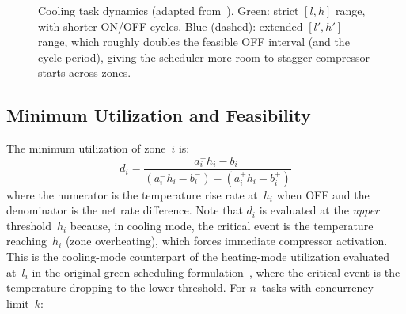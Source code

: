 \documentclass[12pt,a4paper]{article}
\begin{document}
\begin{figure}[H]
\caption{Cooling task dynamics (adapted from~\cite{ref40}). Green: strict $[l, h]$ range, with shorter ON/OFF cycles. Blue (dashed): extended $[l', h']$ range, which roughly doubles the feasible OFF interval (and the cycle period), giving the scheduler more room to stagger compressor starts across zones.}
\label{fig:taskdyn}
\end{figure}

\subsection{Minimum Utilization and Feasibility}

The minimum utilization of zone~$i$ is:
\begin{equation}
d_i = \frac{a_i^- h_i - b_i^-}{(a_i^- h_i - b_i^-) - (a_i^+ h_i - b_i^+)}
\label{eq:di}
\end{equation}
where the numerator is the temperature rise rate at~$h_i$ when OFF and the denominator is the net rate difference. Note that $d_i$ is evaluated at the \textit{upper} threshold~$h_i$ because, in cooling mode, the critical event is the temperature reaching~$h_i$ (zone overheating), which forces immediate compressor activation. This is the cooling-mode counterpart of the heating-mode utilization evaluated at~$l_i$ in the original green scheduling formulation~\cite{ref40}, where the critical event is the temperature dropping to the lower threshold. For $n$~tasks with concurrency limit~$k$:
\end{document}
